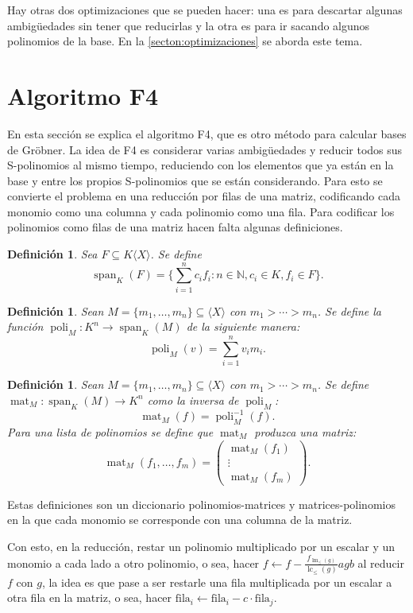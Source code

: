 \documentclass[12pt]{report}
\theoremstyle{customstyle}
\newtheorem{definition}[theorem]{Definición}
\theoremstyle{factstyle}
\DeclareMathOperator{\lm}{lm}
\DeclareMathOperator{\lc}{lc}
\DeclareMathOperator{\spn}{span} %
\DeclareMathOperator{\mat}{mat}
\DeclareMathOperator{\poli}{poli}
\begin{document}
Hay otras dos optimizaciones que se pueden hacer: una es para descartar algunas ambigüedades sin tener que reducirlas y la otra es para ir sacando algunos polinomios de la base. En la \cref{secton:optimizaciones} se aborda este tema.

\section{Algoritmo F4}

En esta sección se explica el algoritmo F4, que es otro método para calcular bases de Gröbner. La idea de F4 es considerar varias ambigüedades y reducir todos sus S-polinomios al mismo tiempo, reduciendo con los elementos que ya están en la base y entre los propios S-polinomios que se están considerando. Para esto se convierte el problema en una reducción por filas de una matriz, codificando cada monomio como una columna y cada polinomio como una fila. Para codificar los polinomios como filas de una matriz hacen falta algunas definiciones.

\begin{definition}
  Sea $F ⊆ K⟨X⟩$. Se define
  \[ \spn_K(F) = \{∑_{i = 1}^n c_i f_i : n ∈ ℕ, c_i ∈ K, f_i ∈ F\} \text{.} \]
\end{definition}

\begin{definition}
  Sean $M = \{m_1, …, m_n\} ⊆ ⟨X⟩$ con $m_1 > ⋯ > m_n$. Se define la función $\poli_M : K^n → \spn_K(M)$ de la siguiente manera:
  \[ \poli_M(v) = ∑_{i = 1}^n v_i m_i \text{.} \]
\end{definition}

\begin{definition}
  Sean $M = \{m_1, …, m_n\} ⊆ ⟨X⟩$ con $m_1 > ⋯ > m_n$. Se define $\mat_M : \spn_K(M) → K^n$ como la inversa de $\poli_M$:
  \[ \mat_M(f) = \poli_M^{-1}(f) \text{.} \]
  Para una lista de polinomios se define que $\mat_M$ produzca una matriz:
  \[ \mat_M(f_1, …, f_m) = \begin{pmatrix} \mat_M(f_1) \\ ⋮ \\ \mat_M(f_m) \end{pmatrix} \text{.} \]
\end{definition}

Estas definiciones son un diccionario polinomios-matrices y matrices-polinomios en la que cada monomio se corresponde con una columna de la matriz.

Con esto, en la reducción, restar un polinomio multiplicado por un escalar y un monomio a cada lado a otro polinomio, o sea, hacer $f ← f - \frac{f_{\lm_≤(g)}}{\lc_≤(g)}a g b$ al reducir $f$ con $g$, la idea es que pase a ser restarle una fila multiplicada por un escalar a otra fila en la matriz, o sea, hacer $\text{fila}_i ← \text{fila}_i - c · \text{fila}_j$.
\end{document}
